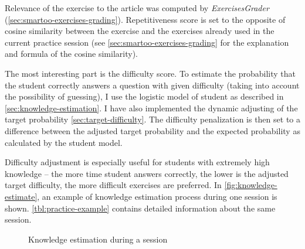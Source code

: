 \documentclass[12pt, twoside]{fithesis2}
\renewcommand{\_}{\leavevmode \kern0.07em\vbox{\hrule width0.4em}}
\begin{document}
Relevance of the exercise to the article was computed by \textit{ExercisesGrader}
(\autoref{sec:smartoo-exercises-grading}).
Repetitiveness score is set to the opposite of cosine similarity between the exercise and the exercises already used in the current practice session
(see \autoref{sec:smartoo-exercises-grading} for the explanation and formula of the cosine similarity).

The most interesting part is the difficulty score.
To estimate the probability that the student correctly answers a question with given difficulty (taking into account the possibility of guessing),
I use the logistic model of student as described in \autoref{sec:knowledge-estimation}.
I have also implemented the dynamic adjusting of the target probability \autoref{sec:target-difficulty}.
The difficulty penalization is then set to a difference between the adjusted target probability and the expected probability as calculated by the student model.

Difficulty adjustment is especially useful for students with extremely high knowledge -- the more time student answers correctly, the lower is the adjusted target difficulty, the more difficult exercises are preferred.
In \autoref{fig:knowledge-estimate}, an example of knowledge estimation process during one session is shown.
\autoref{tbl:practice-example} contains detailed information about the same session.

\begin{figure}[h]
\centering
{}
  \caption{Knowledge estimation during a session}
  \label{fig:knowledge-estimate}
\end{figure}
\end{document}
